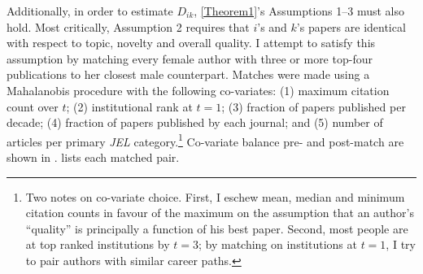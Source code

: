 Additionally, in order to estimate $D_{ik}$, \autoref{Theorem1}'s Assumptions 1--3 must also hold. Most critically, Assumption 2 requires that $i$'s and $k$'s papers are identical with respect to topic, novelty and overall quality. I attempt to satisfy this assumption by matching every female author with three or more top-four publications to her closest male counterpart. Matches were made using a Mahalanobis procedure with the following co-variates: (1) maximum citation count over $t$; (2) institutional rank at $t=1$; (3) fraction of papers published per decade; (4) fraction of papers published by each journal; and (5) number of articles per primary \emph{JEL} category.\footnote{Two notes on co-variate choice. First, I eschew mean, median and minimum citation counts in favour of the maximum on the assumption that an author's ``quality'' is principally a function of his best paper. Second, most people are at top ranked institutions by $t=3$; by matching on institutions at $t=1$, I try to pair authors with similar career paths.} Co-variate balance pre- and post-match are shown in .  lists each matched pair.

